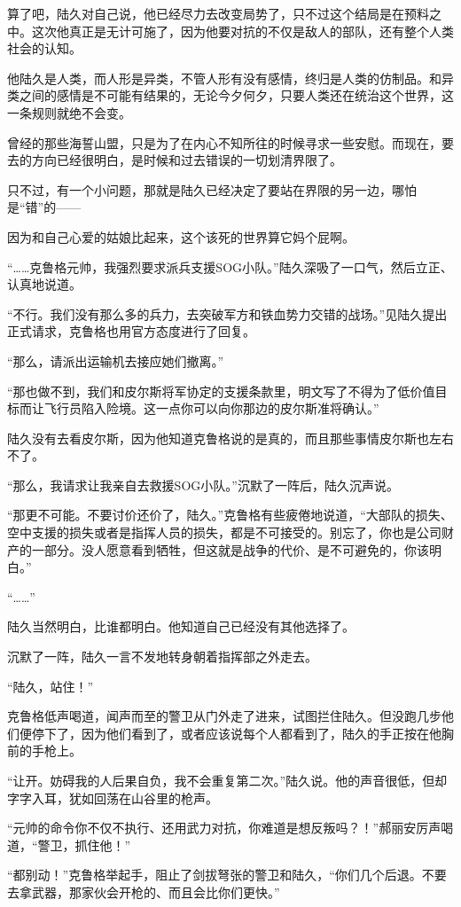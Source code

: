 算了吧，陆久对自己说，他已经尽力去改变局势了，只不过这个结局是在预料之中。这次他真正是无计可施了，因为他要对抗的不仅是敌人的部队，还有整个人类社会的认知。

他陆久是人类，而人形是异类，不管人形有没有感情，终归是人类的仿制品。和异类之间的感情是不可能有结果的，无论今夕何夕，只要人类还在统治这个世界，这一条规则就绝不会变。

曾经的那些海誓山盟，只是为了在内心不知所往的时候寻求一些安慰。而现在，要去的方向已经很明白，是时候和过去错误的一切划清界限了。

只不过，有一个小问题，那就是陆久已经决定了要站在界限的另一边，哪怕是“错”的——

因为和自己心爱的姑娘比起来，这个该死的世界算它妈个屁啊。

“……克鲁格元帅，我强烈要求派兵支援SOG小队。”陆久深吸了一口气，然后立正、认真地说道。

“不行。我们没有那么多的兵力，去突破军方和铁血势力交错的战场。”见陆久提出正式请求，克鲁格也用官方态度进行了回复。

“那么，请派出运输机去接应她们撤离。”

“那也做不到，我们和皮尔斯将军协定的支援条款里，明文写了不得为了低价值目标而让飞行员陷入险境。这一点你可以向你那边的皮尔斯准将确认。”

陆久没有去看皮尔斯，因为他知道克鲁格说的是真的，而且那些事情皮尔斯也左右不了。

“那么，我请求让我亲自去救援SOG小队。”沉默了一阵后，陆久沉声说。

“那更不可能。不要讨价还价了，陆久。”克鲁格有些疲倦地说道，“大部队的损失、空中支援的损失或者是指挥人员的损失，都是不可接受的。别忘了，你也是公司财产的一部分。没人愿意看到牺牲，但这就是战争的代价、是不可避免的，你该明白。”

“……”

陆久当然明白，比谁都明白。他知道自己已经没有其他选择了。

沉默了一阵，陆久一言不发地转身朝着指挥部之外走去。

“陆久，站住！”

克鲁格低声喝道，闻声而至的警卫从门外走了进来，试图拦住陆久。但没跑几步他们便停下了，因为他们看到了，或者应该说每个人都看到了，陆久的手正按在他胸前的手枪上。

“让开。妨碍我的人后果自负，我不会重复第二次。”陆久说。他的声音很低，但却字字入耳，犹如回荡在山谷里的枪声。

“元帅的命令你不仅不执行、还用武力对抗，你难道是想反叛吗？！”郝丽安厉声喝道，“警卫，抓住他！”

“都别动！”克鲁格举起手，阻止了剑拔弩张的警卫和陆久，“你们几个后退。不要去拿武器，那家伙会开枪的、而且会比你们更快。”

